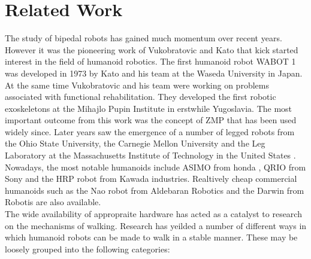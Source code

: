 \documentclass[12pt,twoside]{article}
\theoremstyle{plain}
\theoremstyle{definition}
\theoremstyle{remark}
\newcommand{\forceindent}{\leavevmode{\parindent=2em\indent}}
\begin{document}
\section{Related Work}
\label{sec:Related_Work}
\forceindent The study of bipedal robots has gained much momentum over recent years. However it was the pioneering work of Vukobratovic \cite{vukobratovic1969contribution} \cite{jurivcic1972mathematical} and Kato \cite{kato1973development} that kick started interest in the field of humanoid robotics. The first humanoid robot WABOT 1 was developed in 1973 by Kato and his team at the Waseda University in Japan. At the same time Vukobratovic and his team were working on problems associated with functional rehabilitation. They developed the first robotic exoskeletons at the Mihajlo Pupin Institute in erstwhile Yugoslavia. The most important outcome from this work was the concept of ZMP that has been used widely since. Later years saw the emergence of a number of legged robots from the Ohio State University, the Carnegie Mellon University and the Leg Laboratory at the Massachusetts Institute of Technology in the United States \cite{siciliano2008springer}. Nowadays, the most notable humanoids include ASIMO from honda \cite{sakagami2002intelligent}, QRIO from Sony and the HRP robot from Kawada industries. Realtively cheap commercial humanoids such as the Nao robot from Aldebaran Robotics and the Darwin from Robotis are also available.\\
\forceindent The wide availability of appropraite hardware has acted as a catalyst to research on the mechanisms of walking. Research has yeilded a number of different ways in which humanoid robots can be made to walk in a stable manner. These may be loosely grouped into the following categories:\\
\end{document}
